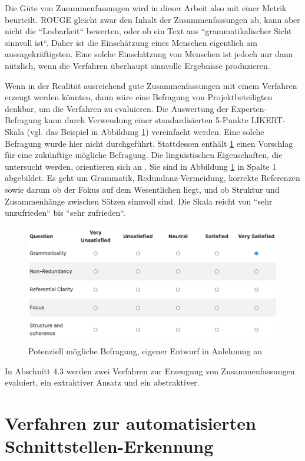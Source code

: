 Die Güte von Zusammenfassungen wird in dieser Arbeit also mit einer Metrik beurteilt. ROUGE gleicht zwar den Inhalt der Zusammenfassungen ab, kann aber nicht die ``Lesbarkeit`` bewerten, oder ob ein Text aus ``grammatikalischer Sicht sinnvoll ist``. Daher ist die Einschätzung eines Menschen eigentlich am aussagekräftigsten. Eine solche Einschätzung von Menschen ist jedoch nur dann nützlich, wenn die Verfahren überhaupt sinnvolle Ergebnisse produzieren. 

Wenn in der Realität ausreichend gute Zusammenfassungen mit einem Verfahren erzeugt werden könnten, dann wäre eine Befragung von Projektbeteiligten denkbar, um die Verfahren zu evaluieren. Die Auswertung der Experten-Befragung kann durch Verwendung einer standardisierten 5-Punkte LIKERT-Skala (vgl. das Beispiel in Abbildung \ref{Abbildung:Dang}) vereinfacht werden. Eine solche Befragung wurde hier nicht durchgeführt. Stattdessen enthält \ref{Abbildung:Dang} einen Vorschlag für eine zukünftige mögliche Befragung. Die linguistischen Eigenschaften, die untersucht werden, orientieren sich an \cite{Dang}. Sie sind in Abbildung \ref{Abbildung:Dang} in Spalte 1 abgebildet. Es geht um Grammatik, Redundanz-Vermeidung, korrekte Referenzen sowie darum ob der Fokus auf dem Wesentlichen liegt, und ob Struktur und Zusammenhänge zwischen Sätzen sinnvoll sind. Die Skala reicht von ``sehr unzufrieden`` bis ``sehr zufrieden``. 
 
\begin{figure}[h]
\centering
\includegraphics[scale=0.9]{content/pics/Picture_9.png}
\caption{ Potenziell mögliche Befragung, eigener Entwurf in Anlehnung an \cite{Dang}}
\label{Abbildung:Dang}
\end{figure}

In Abschnitt 4.3 werden zwei Verfahren zur Erzeugung von Zusammenfassungen evaluiert, ein extraktiver Ansatz und ein abstraktiver.


\section{Verfahren zur automatisierten Schnittstellen-Erkennung}

